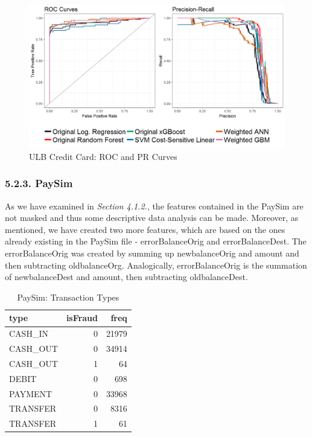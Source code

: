 \documentclass[12pt,]{article}
\begin{document}
\begin{figure}
\centering
\includegraphics[width=1\textwidth,height=\textheight]{figures/credit/cr_card_roc_pr.png}
\caption{ULB Credit Card: ROC and PR Curves}
\end{figure}

\hypertarget{paysim-1}{%
\subsubsection{5.2.3. PaySim}\label{paysim-1}}

As we have examined in \emph{Section 4.1.2.}, the features contained in
the PaySim are not masked and thus some descriptive data analysis can be
made. Moreover, as mentioned, we have created two more features, which
are based on the ones already existing in the PaySim file -
errorBalanceOrig and errorBalanceDest. The errorBalanceOrig was created
by summing up newbalanceOrig and amount and then subtracting
oldbalanceOrg. Analogically, errorBalanceOrig is the summation of
newbalanceDest and amount, then subtracting oldbalanceDest.

\begin{table}

\caption{\label{tab:paySim_fraud_types}PaySim: Transaction Types}
\centering
\fontsize{8}{10}\selectfont
\begin{tabular}[t]{lrr}
\toprule
type & isFraud & freq\\
\midrule
CASH\_IN & 0 & 21979\\
CASH\_OUT & 0 & 34914\\
CASH\_OUT & 1 & 64\\
DEBIT & 0 & 698\\
PAYMENT & 0 & 33968\\
\addlinespace
TRANSFER & 0 & 8316\\
TRANSFER & 1 & 61\\
\bottomrule
\end{tabular}
\end{table}
\end{document}
